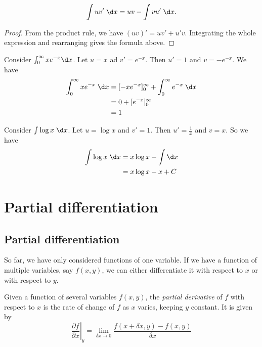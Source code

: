 \documentclass[a4paper]{article}
\begin{document}
\begin{thm}
  \[
    \int uv'\;\d x = uv - \int vu' \;\d x.
  \]
\end{thm}

\begin{proof}
  From the product rule, we have $(uv)' = uv' + u'v$. Integrating the whole expression and rearranging gives the formula above.
\end{proof}

\begin{eg}
  Consider $\int_0^\infty xe^{-x}\d x$. Let $u = x$ ad $v' = e^{-x}$. Then $u' = 1$ and $v = -e^{-x}$. We have
  \begin{align*}
    \int_0^\infty xe^{-x}\;\d x &= [-xe^{-x}]^\infty_0 + \int_0^\infty e^{-x} \;\d x\\
    &= 0 + [e^{-x}]_0^\infty\\
    &= 1
  \end{align*}
\end{eg}

\begin{eg}
  Consider $\int \log x\; \d x$. Let $u = \log x$ and $v' = 1$. Then $u' = \frac{1}{x}$ and $v = x$. So we have
  \begin{align*}
    \int \log x\; \d x &= x\log x - \int \d x\\
    &= x \log x - x + C
  \end{align*}
\end{eg}

\section{Partial differentiation}
\subsection{Partial differentiation}
So far, we have only considered functions of one variable. If we have a function of multiple variables, say $f(x, y)$, we can either differentiate it with respect to $x$ or with respect to $y$.
\begin{defi}
  Given a function of several variables $f(x, y)$, the \emph{partial derivative} of $f$ with respect to $x$ is the rate of change of $f$ as $x$ varies, keeping $y$ constant. It is given by
  \[
    \left. \frac{\partial f}{\partial x}\right|_y = \lim_{\delta x\to 0} \frac{f(x + \delta x, y) - f(x, y)}{\delta x}
  \]
\end{defi}
\end{document}
